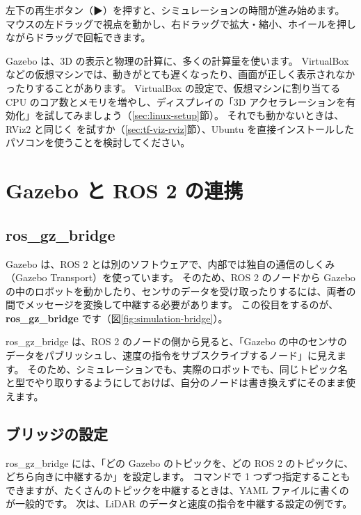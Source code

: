 左下の再生ボタン（▶）を押すと、シミュレーションの時間が進み始めます。
マウスの左ドラッグで視点を動かし、右ドラッグで拡大・縮小、ホイールを押しながらドラッグで回転できます。

\begin{caution}
  Gazebo は、3D の表示と物理の計算に、多くの計算量を使います。
  VirtualBox などの仮想マシンでは、動きがとても遅くなったり、画面が正しく表示されなかったりすることがあります。
  VirtualBox の設定で、仮想マシンに割り当てる CPU のコア数とメモリを増やし、ディスプレイの「3D アクセラレーションを有効化」を試してみましょう（\ref{sec:linux-setup}節）。
  それでも動かないときは、RViz2 と同じく  を試すか（\ref{sec:tf-viz-rviz}節）、Ubuntu を直接インストールしたパソコンを使うことを検討してください。
\end{caution}

\section{Gazebo と ROS 2 の連携}
\label{sec:simulation-bridge}

\subsection{ros\_gz\_bridge}

Gazebo は、ROS 2 とは別のソフトウェアで、内部では独自の通信のしくみ（Gazebo Transport）を使っています。
そのため、ROS 2 のノードから Gazebo の中のロボットを動かしたり、センサのデータを受け取ったりするには、両者の間でメッセージを変換して中継する必要があります。
この役目をするのが、\textbf{ros\_gz\_bridge} です（図\ref{fig:simulation-bridge}）。

ros\_gz\_bridge は、ROS 2 のノードの側から見ると、「Gazebo の中のセンサのデータをパブリッシュし、速度の指令をサブスクライブするノード」に見えます。
そのため、シミュレーションでも、実際のロボットでも、同じトピック名と型でやり取りするようにしておけば、自分のノードは書き換えずにそのまま使えます。

\subsection{ブリッジの設定}

ros\_gz\_bridge には、「どの Gazebo のトピックを、どの ROS 2 のトピックに、どちら向きに中継するか」を設定します。
コマンドで 1 つずつ指定することもできますが、たくさんのトピックを中継するときは、YAML ファイルに書くのが一般的です。
次は、LiDAR のデータと速度の指令を中継する設定の例です。

